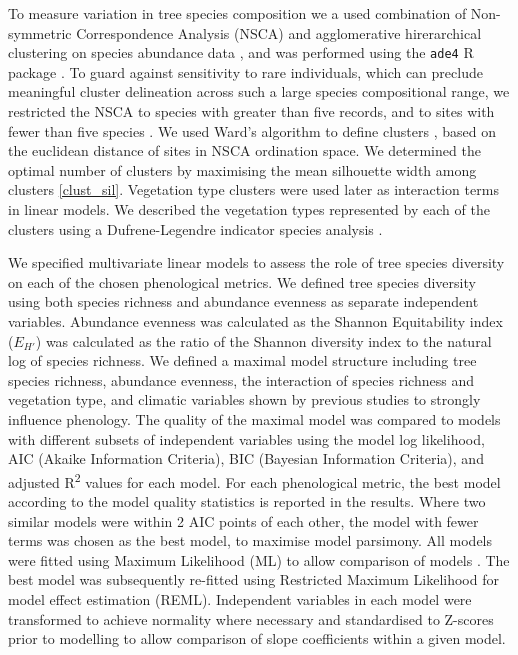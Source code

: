 \documentclass[11pt,a4paper]{article}
\begin{document}
To measure variation in tree species composition we a used combination of Non-symmetric Correspondence Analysis (NSCA) and agglomerative hirerarchical clustering on species abundance data \citep{Kreft2010, Fayolle2014}, and was performed using the \texttt{ade4} R package \citep{ade4}. To guard against sensitivity to rare individuals, which can preclude meaningful cluster delineation across such a large species compositional range, we restricted the NSCA to species with greater than five records, and to sites with fewer than five species \citep{}. We used Ward's algorithm to define clusters \citep{Murtagh2014}, based on the euclidean distance of sites in NSCA ordination space. We determined the optimal number of clusters by maximising the mean silhouette width among clusters \citep{Rousseeuw1987} \autoref{clust_sil}. Vegetation type clusters were used later as interaction terms in linear models. We described the vegetation types represented by each of the clusters using a Dufrene-Legendre indicator species analysis \citep{Dufrene1997}.

We specified multivariate linear models to assess the role of tree species diversity on each of the chosen phenological metrics. We defined tree species diversity using both species richness and abundance evenness as separate independent variables. Abundance evenness was calculated as the Shannon Equitability index ($E_{H'}$) \citep{Smith1996} was calculated as the ratio of the Shannon diversity index to the natural log of species richness. We defined a maximal model structure including tree species richness, abundance evenness, the interaction of species richness and vegetation type, and climatic variables shown by previous studies to strongly influence phenology. The quality of the maximal model was compared to models with different subsets of independent variables using the model log likelihood, AIC (Akaike Information Criteria), BIC (Bayesian Information Criteria), and adjusted R\textsuperscript{2} values for each model. For each phenological metric, the best model according to the model quality statistics is reported in the results. Where two similar models were within 2 AIC points of each other, the model with fewer terms was chosen as the best model, to maximise model parsimony. All models were fitted using Maximum Likelihood (ML) to allow comparison of models \citep{}. The best model was subsequently re-fitted using Restricted Maximum Likelihood for model effect estimation (REML). Independent variables in each model were transformed to achieve normality where necessary and standardised to Z-scores prior to modelling to allow comparison of slope coefficients within a given model. 
\end{document}
